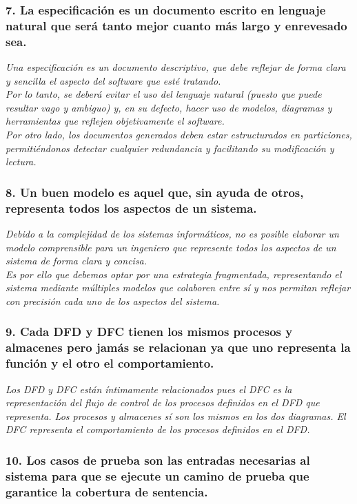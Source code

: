 \subsubsection*{7. La especificación es un documento escrito en lenguaje natural que será tanto mejor cuanto más largo y enrevesado sea.}
\textit{Una especificación es un documento descriptivo, que debe reflejar de forma clara y sencilla el aspecto del software que esté tratando.\\
    Por lo tanto, se deberá evitar el uso del lenguaje natural (puesto que puede resultar vago y ambiguo) y, en su defecto, hacer uso de modelos, diagramas y herramientas que reflejen objetivamente el software.\\
    Por otro lado, los documentos generados deben estar estructurados en particiones, permitiéndonos detectar cualquier redundancia y facilitando su modificación y lectura.
}

\subsubsection*{8. Un buen modelo es aquel que, sin ayuda de otros, representa todos los aspectos de un sistema.}
\textit{Debido a la complejidad de los sistemas informáticos, no es posible elaborar un modelo comprensible para un ingeniero que represente todos los aspectos de un sistema de forma clara y concisa.
    \\
    Es por ello que debemos optar por una estrategia fragmentada, representando el sistema mediante múltiples modelos que colaboren entre sí y nos permitan reflejar con precisión cada uno de los aspectos del sistema.
}

\subsubsection*{9. Cada DFD y DFC tienen los mismos procesos y almacenes pero jamás se relacionan ya que uno representa la función y el otro el comportamiento.} %
\textit{Los DFD y DFC están íntimamente relacionados pues el DFC es la representación del flujo de control de los procesos definidos en el DFD que representa. Los procesos y almacenes sí son los mismos en los dos diagramas. El DFC representa el comportamiento de los procesos definidos en el DFD.
}

\subsubsection*{10. Los casos de prueba son las entradas necesarias al sistema para que se ejecute un camino de prueba que garantice la cobertura de sentencia.}

